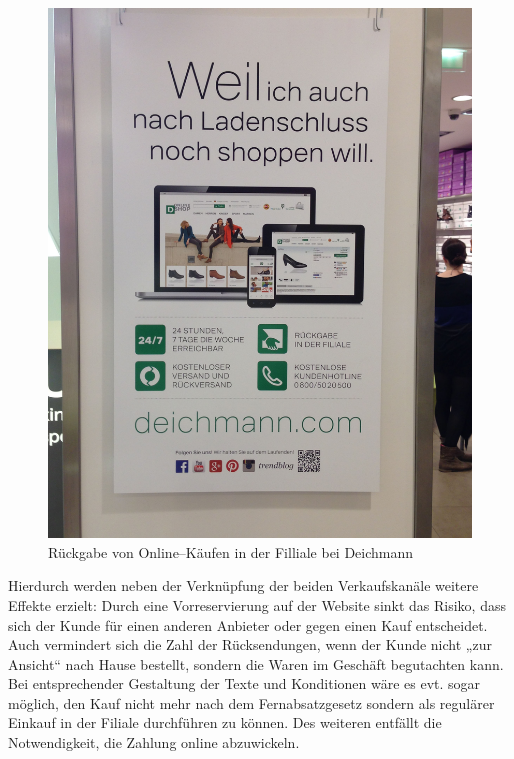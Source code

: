 \begin{minipage}[t]{0.4\textwidth}
\begin{figure}[H]
\begin{center}
\includegraphics[width=\textwidth]{Deichmann-Rueckgabe.jpg}
\caption{Rückgabe von Online--Käufen in der Filliale bei Deichmann}
\label{pic:deichmannab}
\end{center}
\end{figure}
\end{minipage}

Hierdurch werden neben der Verknüpfung der beiden Verkaufskanäle weitere Effekte erzielt: Durch eine Vorreservierung auf der Website sinkt das Risiko, dass sich der Kunde für einen anderen Anbieter oder gegen einen Kauf entscheidet. Auch vermindert sich die Zahl der Rücksendungen, wenn der Kunde nicht „zur Ansicht“ nach Hause bestellt, sondern die Waren im Geschäft begutachten kann. Bei entsprechender Gestaltung der Texte und Konditionen wäre es evt. sogar möglich, den Kauf nicht mehr nach dem Fernabsatzgesetz sondern als regulärer Einkauf in der Filiale durchführen zu können. Des weiteren entfällt die Notwendigkeit, die Zahlung online abzuwickeln.

